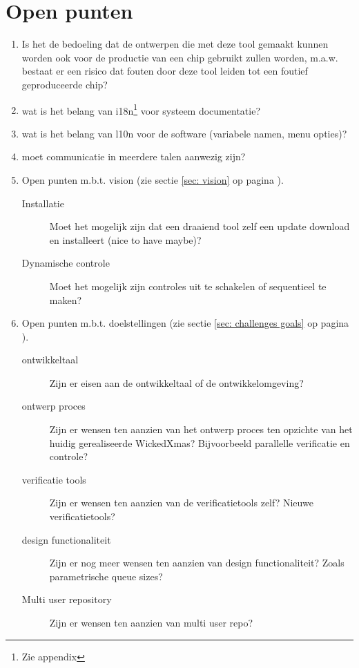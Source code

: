 \documentclass[a4paper,11pt]{article}
\begin{document}
\listoftodos

\section{Open punten}
\label{sec: open-punten}
\begin{enumerate}
 \item Is het de bedoeling dat de ontwerpen die met deze tool gemaakt kunnen worden ook voor de productie van een
 chip gebruikt zullen worden, m.a.w. bestaat er een risico dat fouten door deze tool leiden tot een
 foutief geproduceerde chip?
 \item wat is het belang van i18n\footnote{Zie appendix} voor systeem documentatie?
 \item wat is het belang van l10n voor de software (variabele namen, menu opties)?
 \item moet communicatie in meerdere talen aanwezig zijn?

 \item Open punten m.b.t. vision (zie sectie \ref{sec: vision} op pagina \pageref{sec: vision}).
 \begin{description}
  \item[Installatie] Moet het mogelijk zijn dat een draaiend tool zelf een update download en installeert (nice to have maybe)?
  \item[Dynamische controle] Moet het mogelijk zijn controles uit te schakelen of sequentieel te maken?
 \end{description}

 \item Open punten m.b.t. doelstellingen (zie sectie \ref{sec: challenges goals} op pagina \pageref{sec: challenges goals}).
 \begin{description}
    \item[ontwikkeltaal] Zijn er eisen aan de ontwikkeltaal of de ontwikkelomgeving?
    \item[ontwerp proces] Zijn er wensen ten aanzien van het ontwerp proces ten opzichte van het
	huidig gerealiseerde WickedXmas? Bijvoorbeeld parallelle verificatie en controle?
    \item[verificatie tools] Zijn er wensen ten aanzien van de verificatietools zelf? Nieuwe verificatietools?
    \item[design functionaliteit] Zijn er nog meer wensen ten aanzien van design functionaliteit? Zoals parametrische queue sizes?
    \item[Multi user repository] Zijn er wensen ten aanzien van multi user repo?
 \end{description}
\end{enumerate}
\end{document}
